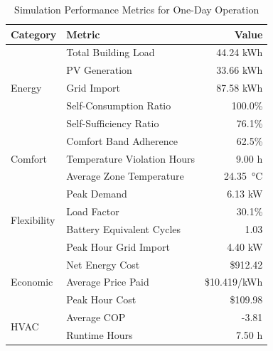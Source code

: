 
\begin{table}[htbp]
\centering
\caption{Simulation Performance Metrics for One-Day Operation}
\label{tab:simulation_metrics}
\begin{tabular}{llr}
\toprule
\textbf{Category} & \textbf{Metric} & \textbf{Value} \\
\midrule
\multirow{5}{*}{Energy} 
    & Total Building Load & 44.24 kWh \\
    & PV Generation & 33.66 kWh \\
    & Grid Import & 87.58 kWh \\
    & Self-Consumption Ratio & 100.0\% \\
    & Self-Sufficiency Ratio & 76.1\% \\
\midrule
\multirow{3}{*}{Comfort}
    & Comfort Band Adherence & 62.5\% \\
    & Temperature Violation Hours & 9.00 h \\
    & Average Zone Temperature & 24.35~°C \\
\midrule
\multirow{4}{*}{Flexibility}
    & Peak Demand & 6.13 kW \\
    & Load Factor & 30.1\% \\
    & Battery Equivalent Cycles & 1.03 \\
    & Peak Hour Grid Import & 4.40 kW \\
\midrule
\multirow{3}{*}{Economic}
    & Net Energy Cost & \$912.42 \\
    & Average Price Paid & \$10.419/kWh \\
    & Peak Hour Cost & \$109.98 \\
\midrule
\multirow{2}{*}{HVAC}
    & Average COP & -3.81 \\
    & Runtime Hours & 7.50 h \\
\bottomrule
\end{tabular}
\end{table}

